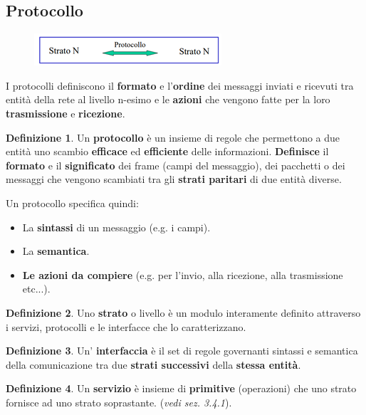\documentclass[11pt,a4paper]{article}
\theoremstyle{definition}
\newtheorem{definition}{Definizione}[section]
\begin{document}
\subsection{Protocollo}
\begin{figure}[!h]
	\includegraphics[scale=0.7]{Immagini/Protocollo.png}
	\centering
\end{figure}
I protocolli definiscono il \textbf{formato} e l’\textbf{ordine} dei
messaggi inviati e ricevuti tra entità della rete al livello n-esimo e
le \textbf{azioni} che vengono fatte per la loro \textbf{trasmissione} e
\textbf{ricezione}.
\theoremstyle{definition}
\begin{definition}
	Un \textbf{protocollo} è un insieme di regole che permettono a due entità uno scambio \textbf{efficace} ed \textbf{efficiente} delle informazioni. \textbf{Definisce} il \textbf{formato} e il
	\textbf{significato} dei frame (campi del messaggio), dei pacchetti o dei messaggi
	che vengono scambiati tra gli \textbf{strati paritari} di due
	entità diverse.
\end{definition}
Un protocollo specifica quindi:
\begin{itemize}
	\item La \textbf{sintassi} di un messaggio (e.g. i campi).
	\item La \textbf{semantica}.
	\item  \textbf{Le azioni da compiere }(e.g. per l'invio, alla ricezione, alla trasmissione etc...).
\end{itemize}
\theoremstyle{definition}
\begin{definition}
	Uno \textbf{strato} o livello è un modulo interamente definito attraverso i
	servizi, protocolli e le interfacce che lo caratterizzano.
\end{definition}
\theoremstyle{definition}
\begin{definition}
	Un' \textbf{interfaccia} è il set di regole governanti sintassi e semantica della comunicazione tra due \textbf{strati successivi} della \textbf{stessa entità}.
\end{definition}
\theoremstyle{definition}
\begin{definition}
	Un \textbf{servizio} è insieme di \textbf{primitive} (operazioni) che uno strato
	fornisce ad uno strato soprastante. (\textit{vedi sez. 3.4.1}).
\end{definition}
\end{document}
